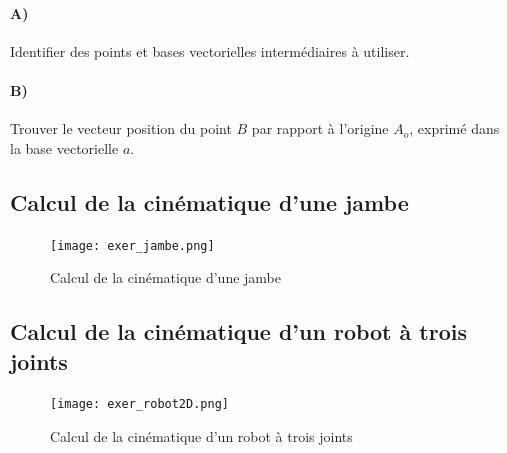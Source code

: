 \paragraph{A)}
Identifier des points et bases vectorielles intermédiaires à utiliser. 

\paragraph{B)} 
Trouver le vecteur position du point $B$ par rapport à l'origine $A_o$, exprimé dans la base vectorielle $a$.




\subsection{Calcul de la cinématique d'une jambe}

\begin{figure}[H]
	\centering
		\texttt{[image: exer\_jambe.png]}
	\caption{Calcul de la cinématique d'une jambe}
	\label{fig:exer_jambe}
\end{figure}


\subsection{Calcul de la cinématique d'un robot à trois joints}

\begin{figure}[H]
	\centering
		\texttt{[image: exer\_robot2D.png]}
	\caption{Calcul de la cinématique d'un robot à trois joints}
	\label{fig:exer_exer_robot2D}
\end{figure}
